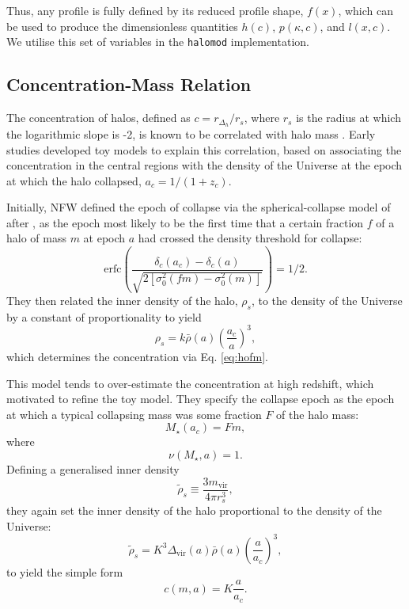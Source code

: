 \documentclass[5p]{elsarticle}
\begin{document}
Thus, any profile is fully defined by its reduced profile shape, $f(x)$, which can be used to produce the dimensionless quantities $h(c)$, $p(\kappa,c)$, and $l(x,c)$. We utilise this set of variables in the \verb|halomod| implementation.

\subsection{Concentration-Mass Relation}
\label{sec:theory:concentration}
The concentration of halos, defined as $c = r_{\Delta_h}/r_s$, where $r_s$ is the radius at which the logarithmic slope is -2, is known to be correlated with halo mass \citep{Navarro1997}. Early studies developed toy models to explain this correlation, based on associating the concentration in the central regions with the density of the Universe at the epoch at which the halo collapsed, $a_c = 1/(1+z_c)$.

Initially, NFW defined the epoch of collapse via the spherical-collapse model of \citet{Press1974} after \citet{Lacey1993}, as the epoch most likely to be the first time that a certain fraction $f$ of a halo of mass $m$ at epoch $a$ had crossed the density threshold for collapse:
\begin{equation}
    \text{erfc}\left(\frac{\delta_c(a_c) - \delta_c(a)}{\sqrt{2\left[\sigma_0^2(fm) - \sigma_0^2(m)\right]}}\right) = 1/2.
\end{equation}
They then related the inner density of the halo, $\rho_s$, to the density of the Universe by a constant of proportionality to yield
\begin{equation}
     \rho_s = k \bar{\rho}(a)\left(\frac{a_c}{a}\right)^3,
\end{equation}
which determines the concentration via Eq. \ref{eq:hofm}.

This model tends to over-estimate the concentration at high redshift, which motivated \citet[][hereafter B01]{Bullock2001} to refine the toy model. They specify the collapse epoch as the epoch at which a typical collapsing mass was some fraction $F$ of the halo mass:
\begin{equation}
    M_\star(a_c) = F m,
\end{equation}
where 
\begin{equation}
    \nu(M_\star,a) = 1.
\end{equation}
Defining a generalised inner density
\begin{equation}
    \tilde{\rho}_s \equiv \frac{3m_\text{vir}}{4 \pi r_s^3},
\end{equation}
they again set the inner density of the halo proportional to the density of the Universe:
\begin{equation}
    \tilde{\rho}_s = K^3 \Delta_\text{vir}(a) \bar{\rho}(a) \left(\frac{a}{a_c}\right)^3,
\end{equation}
to yield the simple form
\begin{equation}
    c(m,a) = K \frac{a}{a_c}.
\end{equation}
\end{document}
